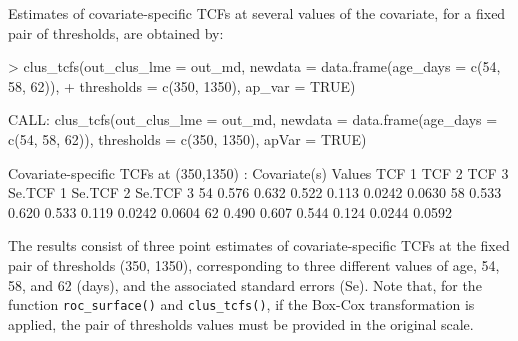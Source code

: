 Estimates of covariate-specific TCFs at several values of the covariate, for a fixed pair of thresholds, are obtained by:
{
\begin{example}
> clus_tcfs(out_clus_lme = out_md, newdata = data.frame(age_days = c(54, 58, 62)), 
+           thresholds = c(350, 1350), ap_var = TRUE)

CALL: clus_tcfs(out_clus_lme = out_md, newdata = data.frame(age_days = c(54, 
    58, 62)), thresholds = c(350, 1350), apVar = TRUE)
 
Covariate-specific TCFs at (350,1350) : 
 Covariate(s) Values TCF 1 TCF 2 TCF 3 Se.TCF 1 Se.TCF 2 Se.TCF 3
                  54 0.576 0.632 0.522    0.113   0.0242   0.0630
                  58 0.533 0.620 0.533    0.119   0.0242   0.0604
                  62 0.490 0.607 0.544    0.124   0.0244   0.0592
\end{example}
}
\noindent
The results consist of three point estimates of covariate-specific TCFs at the fixed pair of thresholds (350, 1350), corresponding to three different values of age, 54, 58, and 62 (days), and the associated standard errors (Se). Note that, for the function \texttt{roc\_surface()} and \texttt{clus\_tcfs()}, if the Box-Cox transformation is applied, the pair of thresholds values must be provided in the original scale.


